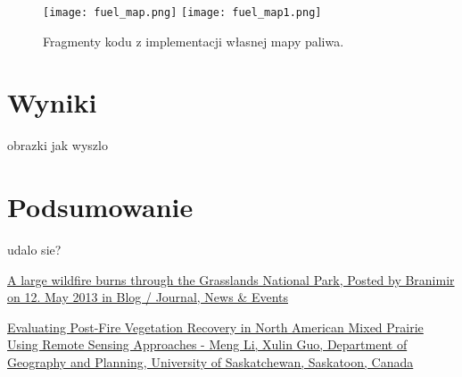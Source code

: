 \documentclass[onecolumn,12pt]{article}
\begin{document}
\begin{figure}[H]
    \centering
    \texttt{[image: fuel\_map.png]}
    \texttt{[image: fuel\_map1.png]}
    \caption{Fragmenty kodu z implementacji własnej mapy paliwa.}
    \label{fig:example}
\end{figure}

\section{Wyniki}
obrazki jak wyszlo

\section{Podsumowanie}
udalo sie? 


\begin{thebibliography}{9}
\href{https://branimirphoto.ca/blog/large-wildfire-burns-through-grasslands-national-park/?fbclid=IwAR10kOfZ03ZdSA12SXVjLDHnmQG8NzV8OXMnwMuYOwZUxyNMMgC7XqHOckw_aem_AbSe3suVXvDvsGvdxdkNPY61Ds63z0wXnrUig_4ZAZlJKoCI8yTPzsxj7_aTuKwY23cInpSUM9UzOpykvzHxRB74}{A large wildfire burns through the Grasslands National Park, Posted by Branimir on 12. May 2013 in Blog / Journal, News & Events}

\href{https://www.researchgate.net/figure/The-study-area-is-located-at-the-West-Block-of-Grasslands-National-Park-Canada_fig1_329806684?fbclid=IwAR3PFg0wUu8cTThq5SnfucD4vLfhBDSiHdCm0ItQ_X1MRRAb6wHOB7PSVHk_aem_AbSmS_GuLnzwRWPWYw2-HxWhtIl7nc200yLzsaJgKKWwgPnn3_5GDcWiLcBwMFFKeqdzxou109j5QDsGDAiHqe_6}{Evaluating Post-Fire Vegetation Recovery in North American Mixed Prairie Using Remote Sensing Approaches - Meng Li, Xulin Guo, Department of Geography and Planning, University of Saskatchewan, Saskatoon, Canada}
\end{thebibliography}
\end{document}
